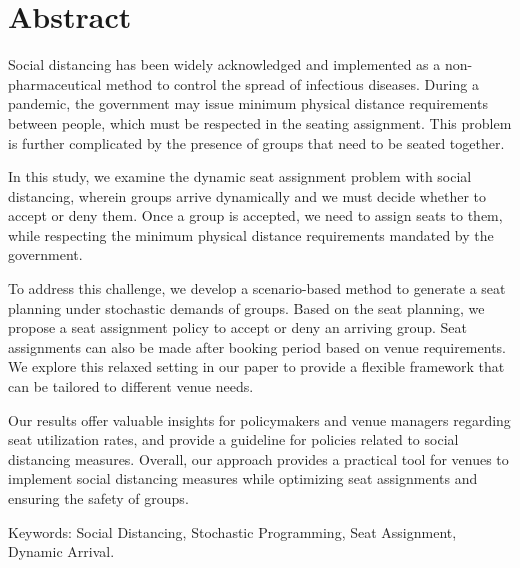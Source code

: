 
\section*{Abstract}

Social distancing has been widely acknowledged and implemented as a non-pharmaceutical method to control the spread of infectious diseases. During a pandemic, the government may issue minimum physical distance requirements between people, which must be respected in the seating assignment. This problem is further complicated by the presence of groups that need to be seated together.

In this study, we examine the dynamic seat assignment problem with social distancing, wherein groups arrive dynamically and we must decide whether to accept or deny them. Once a group is accepted, we need to assign seats to them, while respecting the minimum physical distance requirements mandated by the government.

To address this challenge, we develop a scenario-based method to generate a seat planning under stochastic demands of groups. Based on the seat planning, we propose a seat assignment policy to accept or deny an arriving group. Seat assignments can also be made after booking period based on venue requirements. We explore this relaxed setting in our paper to provide a flexible framework that can be tailored to different venue needs.

Our results offer valuable insights for policymakers and venue managers regarding seat utilization rates, and provide a guideline for policies related to social distancing measures. Overall, our approach provides a practical tool for venues to implement social distancing measures while optimizing seat assignments and ensuring the safety of groups.






Keywords: Social Distancing, Stochastic Programming, Seat Assignment, Dynamic Arrival.
